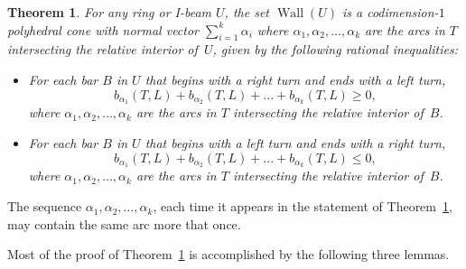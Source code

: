 \documentclass{amsart}
\newtheorem{theorem}[proposition]{Theorem}
\theoremstyle{definition}
\theoremstyle{remark}
\numberwithin{equation}{section}
\newcommand{\0}{{\mathbf{0}}}
\newcommand{\Wall}{\operatorname{Wall}}
\begin{document}
\begin{theorem}\label{wall thm}
For any ring or I-beam $U$, the set $\Wall(U)$ is a codimension-$1$ polyhedral cone with normal vector $\sum_{i=1}^k\alpha_i$ where $\alpha_1, \alpha_2,\ldots,\alpha_k$ are the arcs in $T$ intersecting the relative interior of~$U$, given by the following rational inequalities:
\begin{itemize}
\item For each bar $B$ in $U$ that begins with a right turn and ends with a left turn,
\[ b_{\alpha_1}(T,L) + b_{\alpha_2}(T,L) + ... + b_{\alpha_k}(T,L) \geq 0,\]
where $\alpha_1, \alpha_2,\ldots,\alpha_k$ are the arcs in $T$ intersecting the relative interior of~$B$.
\item For each bar $B$ in $U$ that begins with a left turn and ends with a right turn,
\[ b_{\alpha_1}(T,L) + b_{\alpha_2}(T,L) + ... + b_{\alpha_k}(T,L) \leq 0,\]
where $\alpha_1, \alpha_2,\ldots,\alpha_k$ are the arcs in $T$ intersecting the relative interior of~$B$.
\end{itemize}
\end{theorem}
The sequence $\alpha_1, \alpha_2,\ldots,\alpha_k$, each time it appears in the statement of Theorem~\ref{wall thm}, may contain the same arc more that once.

Most of the proof of Theorem~\ref{wall thm} is accomplished by the following three lemmas.
\end{document}
